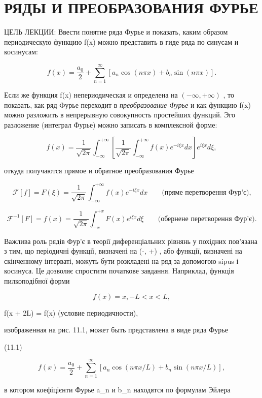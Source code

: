 \documentclass[
  ukrainian,
]{article}
\begin{document}
\section{РЯДЫ И ПРЕОБРАЗОВАНИЯ
ФУРЬЕ}\label{ux440ux44fux434ux44b-ux438-ux43fux440ux435ux43eux431ux440ux430ux437ux43eux432ux430ux43dux438ux44f-ux444ux443ux440ux44cux435}

ЦЕЛЬ ЛЕКЦИИ: Ввести понятие ряда Фурье и показать, каким образом
периодическую функцию f(x) можно представить в гиде ряда по синусам и
косинусам:

\[
f(x) = \frac{a_0}{2} + \sum_{n=1}^{\infty} [a_n \cos(n\pi x) + b_n \sin(n\pi x)].
\]

Если же функция f(x) непериодическая и определена на
\((-\infty, +\infty)\) , то показать, как ряд Фурье переходит в
\emph{преобразование Фурье} и как функцию f(x) можно разложить в
непрерывную совокупность простейших функций. Эго разложение (интеграл
Фурье) можно записать в комплексной форме:

\[
f(x) = \frac{1}{\sqrt{2\pi}} \int_{-\infty}^{+\infty} \left[ \frac{1}{\sqrt{2\pi}} \int_{-\infty}^{+\infty} f(x) e^{-i\xi x} dx \right] e^{i\xi x} d\xi,
\]

откуда получаются прямое и обратное преобразования Фурье

\[
\mathcal{F}[f] = F(\xi) = \frac{1}{\sqrt{2\pi}} \int_{-\infty}^{+\infty} f(x) e^{-i\xi x} dx \qquad \text{(пряме перетворення Фур'є),}
\]

\[
\mathcal{F}^{-1}[F] = f(x) = \frac{1}{\sqrt{2\pi}} \int_{-x}^{+x} F(x) e^{i\xi x} d\xi \qquad \text{(обернене перетворення Фур'є)}.
\]

Важлива роль рядів Фур'є в теорії диференціальних рівнянь у похідних
пов'язана з тим, що періодичні функції, визначені на (-\infty, +\infty)
, або функції, визначені на скінченному інтерваті, можуть бути
розкладені на ряд за допомогою sipus і косинуса. Це дозволяє спростити
початкове завдання. Наприклад, функція пилкоподібної форми

\[
f(x) = x, -L < x < L,
\]

f(x + 2L) = f(x) (условие периодичности),

изображенная на рис. 11.1, может быть представлена в виде ряда Фурье

(11.1)

\[
f(x) = \frac{a_0}{2} + \sum_{n=1}^{\infty} \left[ a_n \cos(n\pi x/L) + b_n \sin(n\pi x/L) \right],
\]

в котором коефіцієнти Фурье a\_n и b\_n находятся по формулам Эйлера
\end{document}
